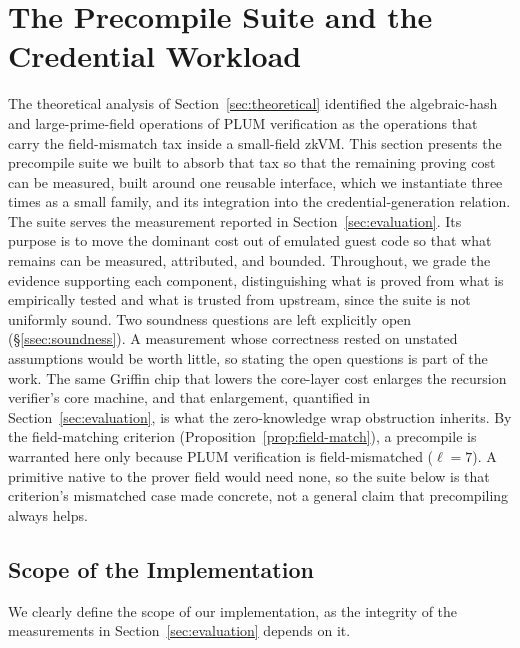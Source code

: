 \section{The Precompile Suite and the Credential Workload}\label{sec:system}
The theoretical analysis of Section~\ref{sec:theoretical} identified the algebraic-hash and large-prime-field operations of PLUM verification as the operations that carry the field-mismatch tax inside a small-field zkVM. This section presents the precompile suite we built to absorb that tax so that the remaining proving cost can be measured, built around one reusable interface, which we instantiate three times as a small family, and its integration into the credential-generation relation. The suite serves the measurement reported in Section~\ref{sec:evaluation}. Its purpose is to move the dominant cost out of emulated guest code so that what remains can be measured, attributed, and bounded. Throughout, we grade the evidence supporting each component, distinguishing what is proved from what is empirically tested and what is trusted from upstream, since the suite is not uniformly sound. Two soundness questions are left explicitly open (\S\ref{ssec:soundness}). A measurement whose correctness rested on unstated assumptions would be worth little, so stating the open questions is part of the work. The same Griffin chip that lowers the core-layer cost enlarges the recursion verifier's core machine, and that enlargement, quantified in Section~\ref{sec:evaluation}, is what the zero-knowledge wrap obstruction inherits. By the field-matching criterion (Proposition~\ref{prop:field-match}), a precompile is warranted here only because PLUM verification is field-mismatched ($\ell=7$). A primitive native to the prover field would need none, so the suite below is that criterion's mismatched case made concrete, not a general claim that precompiling always helps.

\subsection{Scope of the Implementation}\label{ssec:impl-scope}
We clearly define the scope of our implementation, as the integrity of the measurements in Section~\ref{sec:evaluation} depends on it.

